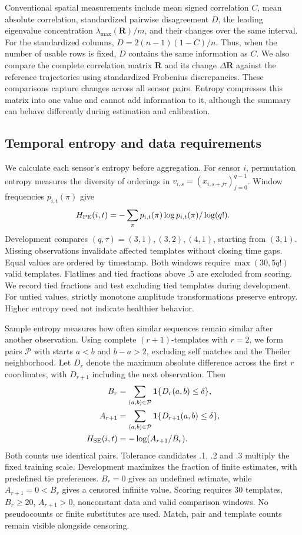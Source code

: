 \documentclass{llncs}
\newcommand{\R}{\mathbf R}
\begin{document}
Conventional spatial measurements include mean signed correlation $C$,
mean absolute correlation, standardized pairwise disagreement $D$,
the leading eigenvalue concentration $\lambda_{\max}(\R)/m$, and
their changes over the same interval. For the standardized columns,
$D=2(n-1)(1-C)/n$. Thus, when the number of usable rows is fixed,
$D$ contains the same information as $C$.
We also compare the complete correlation matrix $\R$ and its change
$\Delta\R$ against the reference trajectories using standardized
Frobenius discrepancies. These comparisons capture changes across all
sensor pairs. Entropy compresses this matrix into one value and cannot
add information to it, although the summary can behave differently
during estimation and calibration.




\subsection{Temporal entropy and data requirements}
We calculate each sensor's entropy before aggregation. For sensor $i$,
permutation entropy measures the diversity of orderings in
$v_{i,s}=(x_{i,s+j\tau})_{j=0}^{q-1}$. Window frequencies $p_{i,t}(\pi)$ give
\begin{equation}
 H_{\rm PE}(i,t)=-\sum_\pi p_{i,t}(\pi)\log p_{i,t}(\pi)/\log(q!).
 \label{eq:pe}
\end{equation}
Development compares $(q,\tau)=(3,1),(3,2),(4,1)$, starting from $(3,1)$.
Missing observations invalidate affected templates without closing time gaps.
Equal values are ordered by timestamp. Both windows require
$\max(30,5q!)$ valid templates. Flatlines and tied fractions above .5 are
excluded from scoring. We record tied fractions and test excluding tied
templates during development. For untied values, strictly monotone amplitude
transformations preserve entropy. Higher entropy need not indicate healthier
behavior.

Sample entropy measures how often similar sequences remain similar after
another observation. Using complete $(r+1)$-templates with $r=2$,
we form pairs $\mathcal P$ with starts $a<b$ and $b-a>2$, excluding
self matches and the Theiler neighborhood. Let $D_r$ denote the
maximum absolute difference across the first $r$ coordinates, with
$D_{r+1}$ including the next observation. Then
\begin{align}
B_r&=\sum_{(a,b)\in\mathcal P}\mathbf1\{D_r(a,b)\leq\delta\},\\
 A_{r+1}&=\sum_{(a,b)\in\mathcal P}\mathbf1\{D_{r+1}(a,b)\leq\delta\},\\
 H_{\rm SE}(i,t)&=-\log(A_{r+1}/B_r).\label{eq:se}
\end{align}
Both counts use identical pairs. Tolerance candidates .1, .2 and .3 multiply
the fixed training scale. Development maximizes the fraction of finite
estimates, with predefined tie preferences. $B_r=0$ gives an undefined
estimate, while $A_{r+1}=0<B_r$ gives a censored infinite value.
Scoring requires 30 templates, $B_r\geq20$, $A_{r+1}>0$, nonconstant
data and valid comparison windows. No pseudocounts or finite substitutes
are used. Match, pair and template counts remain visible alongside censoring.
\end{document}
